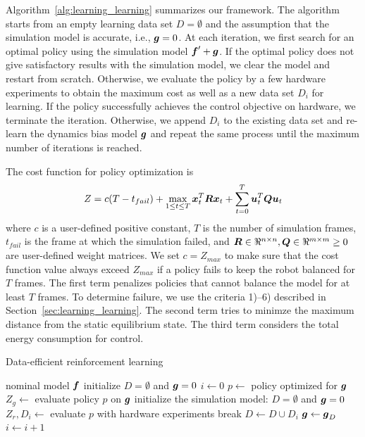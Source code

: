 \documentclass[letterpaper, 10 pt, conference]{ieeeconf}
\begin{document}

Algorithm~\ref{alg:learning_learning} summarizes our framework.
The algorithm starts from an empty learning data set $D=\emptyset$ and
the assumption that the simulation model is accurate, i.e.,
$\mbox{\boldmath \(g\)}=0$.
At each iteration, we first search for an optimal policy using
the simulation model $\mbox{\boldmath \(f\)}' + \mbox{\boldmath \(g\)}$.
If the optimal policy does not give satisfactory results with the
simulation model, we clear the model and restart from scratch.
Otherwise, we evaluate the policy by a few hardware experiments to
obtain the maximum cost as well as a new data set $D_i$ for learning.
If the policy successfully achieves the control objective on hardware,
we terminate the iteration.
Otherwise, we append $D_i$ to the existing data set and re-learn the
dynamics bias model $\mbox{\boldmath \(g\)}$ and repeat the same process until the
maximum number of iterations is reached.

The cost function for policy optimization is
\begin{equation}
Z = c (T-t_{fail}) + \max_{1\leq t \leq T} \mbox{\boldmath \(x\)}_t^T \mbox{\boldmath \(R\)}
 \mbox{\boldmath \(x\)}_t +
\sum_{t=0}^T \mbox{\boldmath \(u\)}_t^T \mbox{\boldmath \(Q\)} \mbox{\boldmath \(u\)}_t
\end{equation}
where $c$ is a user-defined positive constant, $T$ is the number of
simulation frames, $t_{fail}$ is the frame at which the simulation failed, and
$\mbox{\boldmath \(R\)}\in\Re^{n\times n},\mbox{\boldmath \(Q\)}\in\Re^{m\times m}\geq 0$ are
user-defined weight matrices. 
We set $c = Z_{max}$ to make sure that the cost function value always
exceed $Z_{max}$ if a policy fails to keep the robot balanced for $T$
frames. 
The first term penalizes policies that cannot balance the model for at
least $T$ frames. 
To determine failure, we use the criteria 1)--6) described in
Section~\ref{sec:learning_learning}.
The second term tries to minimze the maximum distance from the
static equilibrium state.
The third term considers the total energy consumption for control.


\begin{algorithm}[t]
\caption{Data-efficient reinforcement learning}
\label{alg:learning_learning}
\begin{algorithmic}[1]
\REQUIRE nominal model $\mbox{\boldmath \(f\)}$
\STATE initialize $D=\emptyset$ and $\mbox{\boldmath \(g\)} = 0$ 
\STATE $i \leftarrow 0$
\STATE $p \leftarrow$ policy optimized for $\mbox{\boldmath \(g\)}$
\STATE $Z_g \leftarrow$ evaluate policy $p$ on $\mbox{\boldmath \(g\)}$
\STATE initialize the simulation model: $D=\emptyset$ and $\mbox{\boldmath \(g\)} = 0$
\ENDIF
\STATE $Z_r, D_i \leftarrow$ evaluate $p$ with hardware experiments
\STATE break
\ENDIF
\STATE $D \leftarrow D \cup D_i$
\STATE $\mbox{\boldmath \(g\)} \leftarrow \mbox{\boldmath \(g\)}_D$ 
\STATE $i \leftarrow i+1$
\ENDWHILE
\end{algorithmic}
\end{algorithm}
\end{document}
